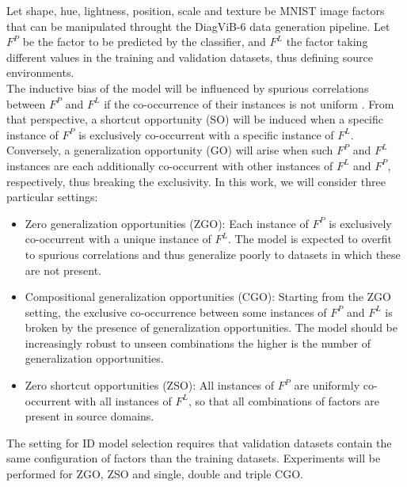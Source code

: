 \begin{definition}[SO/GO in DiagVib-6]\label{def:zso_theory}
    Let shape, hue, lightness, position, scale and texture be MNIST image factors that can be manipulated
    throught the DiagViB-6 data generation pipeline. Let $F^P$ be the factor to be predicted by the 
    classifier, and $F^L$ the factor taking different values in the training and validation datasets,
    thus defining source environments. \\
    
    The inductive bias of the model will be influenced by
    spurious correlations between $F^P$ and $F^L$ if the co-occurrence of their instances is
    not uniform \cite{euligDiagViB6DiagnosticBenchmark2021}. From that perspective, 
    a shortcut opportunity (SO) will be induced when a specific instance of $F^P$ is exclusively co-occurrent with a specific instance of $F^L$.
    Conversely, a generalization opportunity (GO) will arise when such $F^P$ and $F^L$ instances
    are each additionally co-occurrent with other instances of $F^L$ and $F^P$, respectively, thus breaking
    the exclusivity. In this work, we will consider three particular settings:

    \begin{itemize}
        \item Zero generalization opportunities (ZGO): Each instance of $F^P$ is exclusively co-occurrent with a 
        unique instance of $F^L$. The model is expected to overfit to spurious correlations and thus generalize
        poorly to datasets in which these are not present.
        \item Compositional generalization opportunities (CGO): Starting from the ZGO setting, the exclusive co-occurrence
        between some instances of $F^P$ and $F^L$ is broken by the presence of generalization opportunities. The model 
        should be increasingly robust to unseen combinations the higher is the number of generalization opportunities.
        \item Zero shortcut opportunities (ZSO): All instances of $F^P$ are uniformly co-occurrent with all 
        instances of $F^L$, so that all combinations of factors are present in source domains.
    \end{itemize}

    The setting for ID model selection requires that validation datasets contain the
    same configuration of factors than the training datasets. Experiments will be performed for
    ZGO, ZSO and single, double and triple CGO.


\end{definition}
